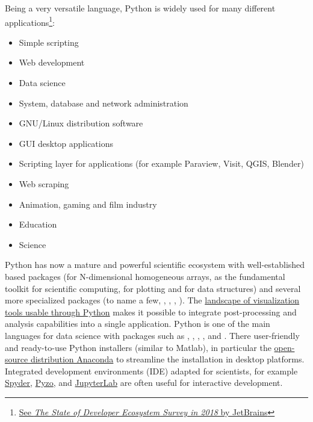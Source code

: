 Being a very versatile language, Python is widely used for many different
applications\footnote{\href{https://www.jetbrains.com/research/devecosystem-2018/python/}{See
\emph{The State of Developer Ecosystem Survey in 2018} by JetBrains}}:

\begin{itemize}
\item Simple scripting

\item Web development

\item Data science

\item System, database and network administration

\item GNU/Linux distribution software

\item GUI desktop applications

\item Scripting layer for applications (for example Paraview, Visit, QGIS,
	Blender)

\item Web scraping

\item Animation, gaming and film industry

\item Education

\item Science

\end{itemize}

Python
has now a mature and powerful scientific ecosystem with well-established based
packages (\Numpy for N-dimensional homogeneous arrays, \Scipy as the
fundamental toolkit for scientific computing,  for plotting
and  for data structures) and several more specialized packages
(to name a few, , , , ).
The \href{https://github.com/rougier/python-visualization-landscape}{%
landscape of visualization tools usable through Python} makes it possible to
integrate post-processing and analysis capabilities into a single application.
%
Python is one of the main languages for data science with packages such as
, , , ,
 and .
%
There user-friendly and ready-to-use Python installers (similar to Matlab), in
particular the
\href{https://en.wikipedia.org/wiki/Anaconda_(Python_distribution)}{%
open-source distribution Anaconda} to streamline the installation in 
desktop platforms.
Integrated development environments (IDE) adapted for
scientists, for example \href{https://github.com/spyder-ide/spyder}{Spyder},
\href{https://pyzo.org}{Pyzo},
and \href{https://jupyterlab.readthedocs.io}{JupyterLab} are often useful for
interactive development.

